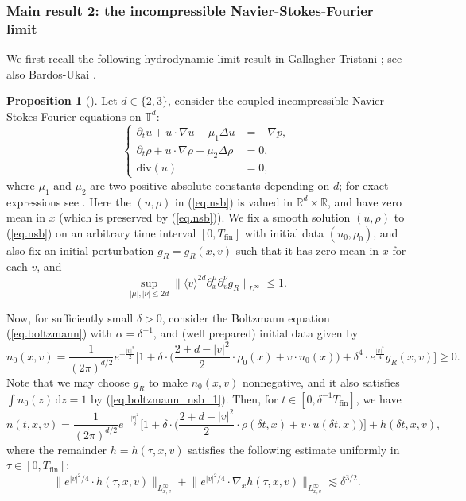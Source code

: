 \documentclass[10pt, reqno]{amsart}
\newcommand{\Rb}{\mathbb R}
\newcommand{\Tb}{\mathbb T}
\theoremstyle{definition}
\newtheorem{proposition}[theorem]{Proposition}
\theoremstyle{remark}
\numberwithin{equation}{section}
\begin{document}
\subsubsection{Main result 2: the incompressible Navier-Stokes-Fourier limit} We first recall the following hydrodynamic limit result in Gallagher-Tristani \cite{GT20}; see also Bardos-Ukai \cite{BU91}.
\begin{proposition}[\cite{GT20}]\label{prop.fluid_2} Let $d\in\{2,3\}$, consider the coupled incompressible Navier-Stokes-Fourier equations on $\Tb^d$:
\begin{equation}\label{eq.nsb}
\left\{
\begin{aligned}
\partial_tu+u\cdot\nabla u-\mu_1\Delta u &=-\nabla p,\\
\partial_t\rho+u\cdot\nabla\rho-\mu_2\Delta\rho&=0,\\
\mathrm{div}(u) &=0,
\end{aligned}
\right.
\end{equation} where $\mu_1$ and $\mu_2$ are two positive absolute constants depending on $d$; for exact expressions see \cite{GT20}. Here the $(u,\rho)$ in (\ref{eq.nsb}) is valued in $\Rb^d\times\Rb$, and have zero mean in $x$ (which is preserved by (\ref{eq.nsb})). We fix a smooth solution $(u,\rho)$ to (\ref{eq.nsb}) on an arbitrary time interval $[0,T_{\mathrm{fin}}]$ with initial data $(u_0,\rho_0)$, and also fix an initial perturbation $g_R=g_R(x,v)$ such that it has zero mean in $x$ for each $v$, and 
\begin{equation}\label{eq.error_nsb}\sup_{|\mu|,|\nu|\leq 2d}\big\|\langle v\rangle^{2d}\partial_x^\mu\partial_v^\nu g_R\big\|_{L^\infty}\leq 1.
\end{equation}

Now, for sufficiently small $\delta>0$, consider the Boltzmann equation (\ref{eq.boltzmann}) with $\alpha=\delta^{-1}$, and (well prepared) initial data given by
\begin{equation}\label{eq.boltzmann_nsb_1}
n_0(x,v)=\frac{1}{(2\pi)^{d/2}}e^{-\frac{|v|^2}{2}}\bigg[1+\delta\cdot\bigg(\frac{2+d-|v|^2}{2}\cdot\rho_0(x)+v\cdot u_0(x)\bigg)+\delta^4\cdot e^{\frac{|v|^2}{4}}g_R(x,v)\bigg]\geq 0.
\end{equation} Note that we may choose $g_R$ to make $n_0(x,v)$ nonnegative, and it also satisfies $\int n_0(z)\,\mathrm{d}z=1$ by (\ref{eq.boltzmann_nsb_1}). Then, for $t\in[0,{\delta^{-1}T_{\mathrm{fin}}}]$, we have
\begin{equation}\label{eq.boltzmann_nsb_2}
n(t,x,v)=\frac{1}{(2\pi)^{d/2}}e^{-\frac{|v|^2}{2}}\bigg[1+\delta\cdot\bigg(\frac{2+d-|v|^2}{2}\cdot\rho({\delta t},x)+v\cdot u({\delta t},x)\bigg)\bigg]+h({\delta t},x,v),
\end{equation} where the remainder $h=h({\tau},x,v)$ satisfies the following estimate uniformly in ${\tau}\in[0,T_{\mathrm{fin}}]$:
\begin{equation}\label{eq.boltzmann_nsb_3}
\big\|e^{|v|^2/4}\cdot h({\tau},x,v)\big\|_{L_{x,v}^\infty}+\big\|e^{|v|^2/4}\cdot\nabla_x h({\tau},x,v)\big\|_{L_{x,v}^\infty}\lesssim\delta^{3/2}.
\end{equation}
\end{proposition}
\end{document}
